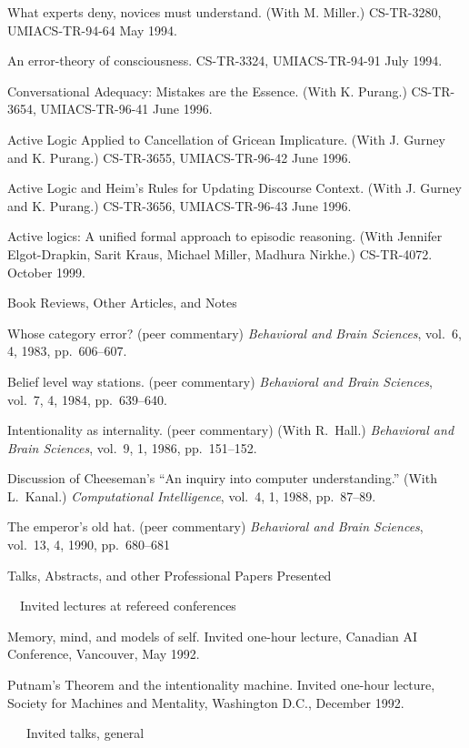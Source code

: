{\paper
What experts deny, novices must understand.
(With M. Miller.)
CS-TR-3280, UMIACS-TR-94-64
May 1994.

\paper
An error-theory of consciousness.
CS-TR-3324, UMIACS-TR-94-91
July 1994.

\paper
Conversational Adequacy: Mistakes are the Essence.
(With K. Purang.)
CS-TR-3654, UMIACS-TR-96-41
June 1996.

\paper
Active Logic Applied to Cancellation of Gricean Implicature.
(With J. Gurney and K. Purang.)
CS-TR-3655, UMIACS-TR-96-42
June 1996.

\paper
Active Logic and Heim's Rules for Updating Discourse Context.
(With J. Gurney and K. Purang.)
CS-TR-3656, UMIACS-TR-96-43
June 1996.

\paper
Active logics: A unified formal approach to episodic
reasoning. (With Jennifer Elgot-Drapkin, Sarit Kraus, Michael Miller,
Madhura Nirkhe.) CS-TR-4072. October 1999.

\subsec Book Reviews, Other Articles, and Notes

\paper
Whose category error?  (peer commentary)
{\sl Behavioral and Brain Sciences},
vol.~6, 4, 1983, pp.~606--607.

\paper
Belief  level  way  stations.  (peer commentary)
{\sl Behavioral and Brain Sciences},
vol.~7, 4, 1984, pp.~639--640.

\paper
Intentionality as internality. (peer commentary)
(With R.~Hall.)
{\sl Behavioral and Brain Sciences},
vol.~9, 1, 1986, pp.~151--152.

\paper
Discussion of Cheeseman's ``An inquiry into computer
understanding.'' (With L.~Kanal.)
{\sl Computational Intelligence},
vol.~4, 1, 1988, pp.~87--89.

\paper
The emperor's old hat. (peer commentary) 
{\sl Behavioral and Brain Sciences}, vol.~13, 4, 1990, pp.~680--681


\subsec Talks, Abstracts, and other Professional Papers Presented

\subsubsec ~~Invited lectures at refereed conferences

\expar
Memory, mind, and models of self. Invited one-hour lecture, Canadian
AI Conference, Vancouver, May 1992.

\expar
Putnam's Theorem and the intentionality machine. Invited one-hour
lecture, Society for Machines and Mentality, Washington D.C., December
1992. 


\subsubsec ~~~Invited talks, general


}
